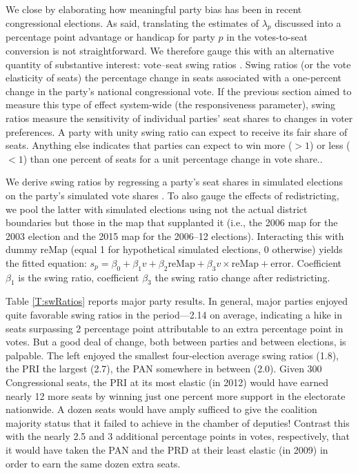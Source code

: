 \documentclass[letter,12pt]{article}
\begin{document}
We close by elaborating how meaningful party bias has been in recent congressional elections. As said, translating the estimates of $\lambda_p$ discussed into a percentage point advantage or handicap for party $p$ in the votes-to-seat conversion is not straightforward. We therefore gauge this with an alternative quantity of substantive interest: vote--seat swing ratios \citep{tufte1973seatsVotes,niemi.fett1986swing}. Swing ratios (or the vote elasticity of seats) the percentage change in seats associated with a one-percent change in the party's national congressional vote. If the previous section aimed to measure this type of effect system-wide (the responsiveness parameter), swing ratios measure the sensitivity of individual parties' seat shares to changes in voter preferences. A party with unity swing ratio can expect to receive its fair share of seats. Anything else indicates that parties can expect to win more ($>1$) or less ($<1$) than one percent of seats for a unit percentage change in vote share.\citep[We rule out negative swing ratios corresponding to a party losing seats as it wins votes; for violations of the monotonicity principle of representation, see][]{balinskiYoung2001FairRep}. 

We derive swing ratios by regressing a party's seat shares in simulated elections on the party's simulated vote shares \citep{linzerSeatVoteElasticity2012}. To also gauge the effects of redistricting, we pool the latter with simulated elections using not the actual district boundaries but those in the map that supplanted it (i.e., the 2006 map for the 2003 election and the 2015 map for the 2006--12 elections). Interacting this with dummy $\text{reMap}$ (equal 1 for hypothetical simulated elections, 0 otherwise) yields the fitted equation: $s_p = \beta_0 + \beta_1 v + \beta_2 \text{reMap} + \beta_3 v \times \text{reMap} + \text{error}$. Coefficient $\beta_1$ is the swing ratio, coefficient $\beta_3$ the swing ratio change after redistricting. 

Table \ref{T:swRatios} reports major party results. In general, major parties enjoyed quite favorable swing ratios in the period---2.14 on average, indicating a hike in seats surpassing 2 percentage point attributable to an extra percentage point in votes. But a good deal of change, both between parties and between elections, is palpable. The left enjoyed the smallest four-election average swing ratios (1.8), the PRI the largest (2.7), the PAN somewhere in between (2.0). Given 300 Congressional seats, the PRI at its most elastic (in 2012) would have earned nearly 12 more seats by winning just one percent more support in the electorate nationwide. A dozen seats would have amply sufficed to give the coalition majority status that it failed to achieve in the chamber of deputies! Contrast this with the nearly 2.5 and 3 additional percentage points in votes, respectively, that it would have taken the PAN and the PRD at their least elastic (in 2009) in order to earn the same dozen extra seats. 
\end{document}
